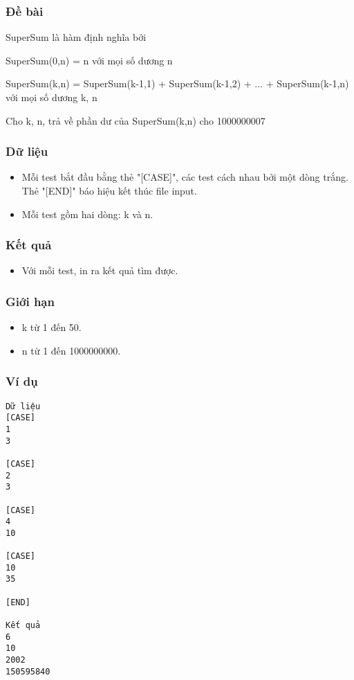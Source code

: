 



\subsubsection{   Đề bài  }

   SuperSum là hàm định nghĩa bởi  

   SuperSum(0,n) = n với mọi số dương n  

   SuperSum(k,n) = SuperSum(k-1,1) + SuperSum(k-1,2) + ... + SuperSum(k-1,n) với mọi số dương k, n  

   Cho k, n, trả về phần dư của SuperSum(k,n) cho 1000000007  

\subsubsection{   Dữ liệu  }
\begin{itemize}
	\item     Mỗi test bắt đầu bằng thẻ "[CASE]", các test cách nhau bởi một dòng trắng. Thẻ "[END]" báo hiệu kết thúc file input.   
	\item     Mỗi test gồm hai dòng: k và n.   
\end{itemize}

\subsubsection{   Kết quả  }
\begin{itemize}
	\item     Với mỗi test, in ra kết quả tìm được.   
\end{itemize}

\subsubsection{   Giới hạn  }
\begin{itemize}
	\item     k từ 1 đến 50.   
	\item     n từ 1 đến 1000000000.   
\end{itemize}

\subsubsection{   Ví dụ  }
\begin{verbatim}
Dữ liệu
[CASE]
1
3

[CASE]
2
3

[CASE]
4
10

[CASE]
10
35

[END]

Kết quả
6
10
2002
150595840
\end{verbatim}